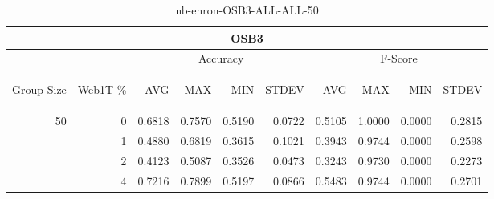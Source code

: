 \begin{center}
\begin{table}[htbp]
\begin{tabular}{ | r | r | r | r | r | r | r | r | r | r |}
\hline
\multicolumn{10}{|c|}{OSB3}\\
\hline
 & & \multicolumn{4}{|c|}{Accuracy} & \multicolumn{4}{|c|}{F-Score}\\ \cline{3-10}
\begin{sideways}Group Size\end{sideways} & \begin{sideways}Web1T \%\end{sideways} & \begin{sideways}AVG\end{sideways} & \begin{sideways}MAX\end{sideways} & \begin{sideways}MIN\end{sideways} & \begin{sideways}STDEV\end{sideways} & \begin{sideways}AVG\end{sideways} & \begin{sideways}MAX\end{sideways} & \begin{sideways}MIN\end{sideways} & \begin{sideways}STDEV\end{sideways}\\
\hline
\multirow{3}{*}{50}
 & 0 & 0.6818 & 0.7570 & 0.5190 & 0.0722 & 0.5105 & 1.0000 & 0.0000 & 0.2815\\ \cline{2-10}
 & 1 & 0.4880 & 0.6819 & 0.3615 & 0.1021 & 0.3943 & 0.9744 & 0.0000 & 0.2598\\ \cline{2-10}
 & 2 & 0.4123 & 0.5087 & 0.3526 & 0.0473 & 0.3243 & 0.9730 & 0.0000 & 0.2273\\ \cline{2-10}
 & 4 & 0.7216 & 0.7899 & 0.5197 & 0.0866 & 0.5483 & 0.9744 & 0.0000 & 0.2701\\ \cline{2-10}
\hline
\end{tabular}
\caption{nb-enron-OSB3-ALL-ALL-50}
\label{table:nb-enron-OSB3-ALL-ALL-50}
\end{table}
\end{center}

